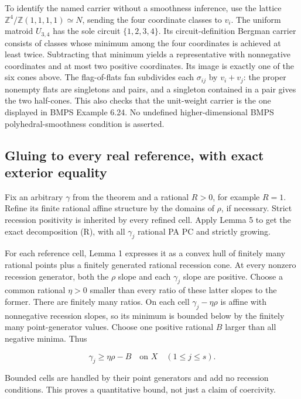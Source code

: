 \documentclass[
  10pt,
]{article}
\begin{document}
To identify the named carrier without a smoothness inference, use the
lattice \(\mathbb Z^4/\mathbb Z(1,1,1,1)\simeq N\), sending the four
coordinate classes to \(v_i\). The uniform matroid \(U_{3,4}\) has the
sole circuit \(\{1,2,3,4\}\). Its circuit-definition Bergman carrier
consists of classes whose minimum among the four coordinates is achieved
at least twice. Subtracting that minimum yields a representative with
nonnegative coordinates and at most two positive coordinates. Its image
is exactly one of the six cones above. The flag-of-flats fan subdivides
each \(\sigma_{ij}\) by \(v_i+v_j\): the proper nonempty flats are
singletons and pairs, and a singleton contained in a pair gives the two
half-cones. This also checks that the unit-weight carrier is the one
displayed in BMPS Example 6.24. No undefined higher-dimensional BMPS
polyhedral-smoothness condition is asserted.

\subsection{Gluing to every real reference, with exact exterior
equality}\label{gluing-to-every-real-reference-with-exact-exterior-equality}

Fix an arbitrary \(\gamma\) from the theorem and a rational \(R>0\), for
example \(R=1\). Refine its finite rational affine structure by the
domains of \(\rho\), if necessary. Strict recession positivity is
inherited by every refined cell. Apply Lemma 5 to get the exact
decomposition (R), with all \(\gamma_j\) rational PA PC and strictly
growing.

For each reference cell, Lemma 1 expresses it as a convex hull of
finitely many rational points plus a finitely generated rational
recession cone. At every nonzero recession generator, both the \(\rho\)
slope and each \(\gamma_j\) slope are positive. Choose a common rational
\(\eta>0\) smaller than every ratio of these latter slopes to the
former. There are finitely many ratios. On each cell
\(\gamma_j-\eta\rho\) is affine with nonnegative recession slopes, so
its minimum is bounded below by the finitely many point-generator
values. Choose one positive rational \(B\) larger than all negative
minima. Thus

\[
\gamma_j\geq\eta\rho-B\quad\text{on }X\quad(1\leq j\leq s). \tag{G1}
\]

Bounded cells are handled by their point generators and add no recession
conditions. This proves a quantitative bound, not just a claim of
coercivity.
\end{document}
